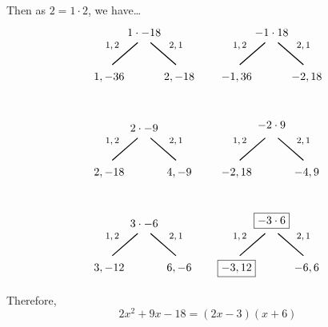 \documentclass[11pt,letterpaper]{article}
\begin{document}
Then as $2= 1 \cdot 2$, we have\dots
	\[
	\begin{tikzpicture}
	\node at (0,0) {$1 \cdot -18$};
	\node at (-1.0,-0.4) {\footnotesize$1, 2$};
	\draw[line width=0.03cm,label={1}] (-0.2,-0.3) -- (-1,-1);
	\node at (-1.1,-1.4) {$1, -36$};
	\node at (1.0,-0.4) {\footnotesize$2,1$};
	\draw[line width=0.03cm] (0.2,-0.3) -- (1,-1);
	\node at (1.1,-1.4) {$2, -18$};	
	
	\tikzset{shift={(4,0)}}

	\node at (0,0) {$-1 \cdot 18$};
	\node at (-1.0,-0.4) {\footnotesize$1, 2$};
	\draw[line width=0.03cm,label={1}] (-0.2,-0.3) -- (-1,-1);
	\node at (-1.1,-1.4) {$-1, 36$};
	\node at (1.0,-0.4) {\footnotesize$2,1$};
	\draw[line width=0.03cm] (0.2,-0.3) -- (1,-1);
	\node at (1.1,-1.4) {$-2, 18$};

	\tikzset{shift={(-4,-3)}}

	\node at (0,0) {$2 \cdot -9$};
	\node at (-1.0,-0.4) {\footnotesize$1, 2$};
	\draw[line width=0.03cm,label={1}] (-0.2,-0.3) -- (-1,-1);
	\node at (-1.1,-1.4) {$2, -18$};
	\node at (1.0,-0.4) {\footnotesize$2,1$};
	\draw[line width=0.03cm] (0.2,-0.3) -- (1,-1);
	\node at (1.1,-1.4) {$4, -9$};

	\tikzset{shift={(4,0)}}

	\node at (0,0.1) {$-2 \cdot 9$};
	\node at (-1.0,-0.4) {\footnotesize$1, 2$};
	\draw[line width=0.03cm,label={1}] (-0.2,-0.3) -- (-1,-1);
	\node at (-1.1,-1.4) {$-2, 18$};
	\node at (1.0,-0.4) {\footnotesize$2,1$};
	\draw[line width=0.03cm] (0.2,-0.3) -- (1,-1);
	\node at (1.1,-1.4) {$-4, 9$};
	
	\tikzset{shift={(-4,-3)}}

	\node at (0,0) {$3 \cdot -6$};
	\node at (-1.0,-0.4) {\footnotesize$1, 2$};
	\draw[line width=0.03cm,label={1}] (-0.2,-0.3) -- (-1,-1);
	\node at (-1.1,-1.4) {$3, -12$};
	\node at (1.0,-0.4) {\footnotesize$2,1$};
	\draw[line width=0.03cm] (0.2,-0.3) -- (1,-1);
	\node at (1.1,-1.4) {$6, -6$};

	\tikzset{shift={(4,0)}}

	\node at (0,0.1) {\framebox{$-3 \cdot 6$}};
	\node at (-1.0,-0.4) {\footnotesize$1, 2$};
	\draw[line width=0.03cm,label={1}] (-0.2,-0.3) -- (-1,-1);
	\node at (-1.1,-1.4) {\framebox{$-3, 12$}};
	\node at (1.0,-0.4) {\footnotesize$2,1$};
	\draw[line width=0.03cm] (0.2,-0.3) -- (1,-1);
	\node at (1.1,-1.4) {$-6, 6$};
	\end{tikzpicture}
	\]

Therefore, 
	\[
	2x^2 + 9x - 18= (2x - 3)(x + 6)
	\]
\end{document}
